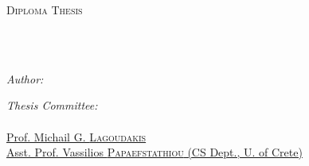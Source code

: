 \documentclass[
	12pt, %
	english,
	onehalfspacing, %
	liststotoc, %
	toctotoc, %
	parskip, %
	headsepline, %
]{MastersDoctoralThesis} %
\author{Emmanouil \textsc{Petrakos}} %
\begin{document}
\frontmatter %

\pagestyle{plain} %

\begin{titlepage}
	\begin{center}
		{\scshape\LARGE \univname\par}
		\vspace{0.5cm} %
		\textsc{\Large Diploma Thesis}\\[0.5cm] %

		\HRule \\[0.4cm] %
		{\huge \bfseries \ttitle\par}\vspace{0.4cm} %
		\HRule \\[0.4cm] %

		\begin{minipage}[t]{0.4\textwidth}
			\begin{flushleft} \large
				\emph{Author:}\\
				{\authorname} %
			\end{flushleft}
		\end{minipage}
		\begin{minipage}[t]{0.5\textwidth}
			\begin{flushright} \large
				\emph{Thesis Committee:} \\
				\href{https://www.ece.tuc.gr/index.php?id=4531&tx_tuclabspersonnel_list\%5Bperson\%5D=289&tx_tuclabspersonnel_list\%5Baction\%5D=person&tx_tuclabspersonnel_list\%5Bcontroller\%5D=List}{\supname}\\ %
				\href{https://www.ece.tuc.gr/index.php?id=4531&tx_tuclabspersonnel_list\%5Bperson\%5D=313&tx_tuclabspersonnel_list\%5Baction\%5D=person&tx_tuclabspersonnel_list\%5Bcontroller\%5D=List}{Prof. Michail G. \textsc{Lagoudakis}}\\
				\href{https://www.ece.tuc.gr/index.php?id=4531&tx_tuclabspersonnel_list\%5Bperson\%5D=313&tx_tuclabspersonnel_list\%5Baction\%5D=person&tx_tuclabspersonnel_list\%5Bcontroller\%5D=List}{Asst. Prof. Vassilios \textsc{Papaefstathiou} (CS Dept., U. of Crete)}
			\end{flushright}
		\end{minipage}\\[0.2cm]


\end{center}
\end{titlepage}
\end{document}
